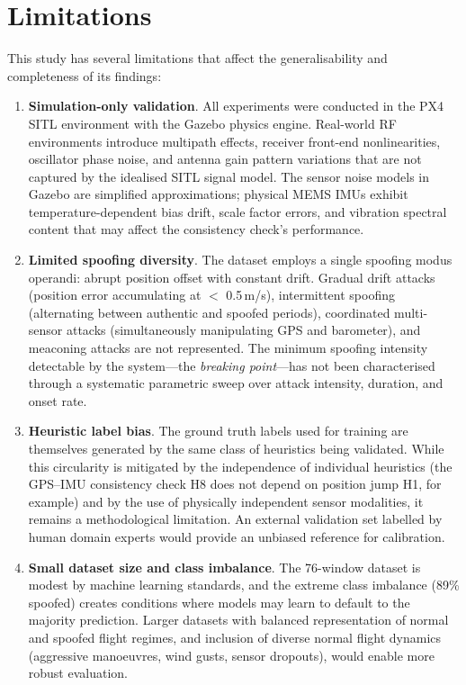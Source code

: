 \section{Limitations}

This study has several limitations that affect the generalisability and completeness of its findings:

\begin{enumerate}
    \item \textbf{Simulation-only validation}. All experiments were conducted in the PX4 SITL environment with the Gazebo physics engine. Real-world RF environments introduce multipath effects, receiver front-end nonlinearities, oscillator phase noise, and antenna gain pattern variations that are not captured by the idealised SITL signal model. The sensor noise models in Gazebo are simplified approximations; physical MEMS IMUs exhibit temperature-dependent bias drift, scale factor errors, and vibration spectral content that may affect the consistency check's performance.
    \item \textbf{Limited spoofing diversity}. The dataset employs a single spoofing modus operandi: abrupt position offset with constant drift. Gradual drift attacks (position error accumulating at $<$ 0.5\,m/s), intermittent spoofing (alternating between authentic and spoofed periods), coordinated multi-sensor attacks (simultaneously manipulating GPS and barometer), and meaconing attacks are not represented. The minimum spoofing intensity detectable by the system---the \textit{breaking point}---has not been characterised through a systematic parametric sweep over attack intensity, duration, and onset rate.
    \item \textbf{Heuristic label bias}. The ground truth labels used for training are themselves generated by the same class of heuristics being validated. While this circularity is mitigated by the independence of individual heuristics (the GPS--IMU consistency check H8 does not depend on position jump H1, for example) and by the use of physically independent sensor modalities, it remains a methodological limitation. An external validation set labelled by human domain experts would provide an unbiased reference for calibration.
    \item \textbf{Small dataset size and class imbalance}. The 76-window dataset is modest by machine learning standards, and the extreme class imbalance (89\% spoofed) creates conditions where models may learn to default to the majority prediction. Larger datasets with balanced representation of normal and spoofed flight regimes, and inclusion of diverse normal flight dynamics (aggressive manoeuvres, wind gusts, sensor dropouts), would enable more robust evaluation.

\end{enumerate}
